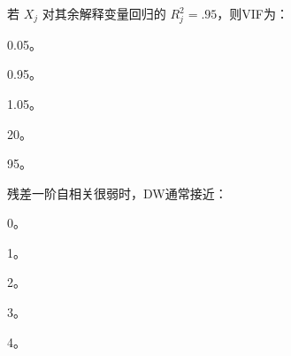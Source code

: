 \par\addvspace{6pt}\noindent\begin{minipage}{\linewidth}


若 \(X_j\) 对其余解释变量回归的 \(R_j^2=.95\)，则VIF为：


\begin{choices}

\item 0.05。

\item 0.95。

\item 1.05。

\item 20。

\item 95。

\end{choices}

\end{minipage}\par\vspace{4pt}

\par\addvspace{6pt}\noindent\begin{minipage}{\linewidth}


残差一阶自相关很弱时，DW通常接近：


\begin{choices}

\item 0。

\item 1。

\item 2。

\item 3。

\item 4。

\end{choices}

\end{minipage}\par\vspace{4pt}

